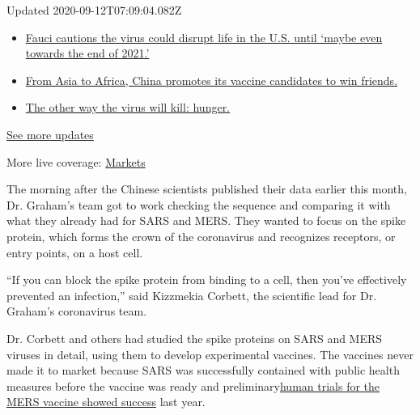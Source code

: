 Updated 2020-09-12T07:09:04.082Z

\begin{itemize}
\tightlist
\item
  \href{https://www.nytimes3xbfgragh.onion/2020/09/11/world/covid-19-coronavirus.html?action=click\&pgtype=Article\&state=default\&region=MAIN_CONTENT_1\&context=storylines_live_updates\#link-dfb8a16}{Fauci
  cautions the virus could disrupt life in the U.S. until `maybe even
  towards the end of 2021.'}
\item
  \href{https://www.nytimes3xbfgragh.onion/2020/09/11/world/covid-19-coronavirus.html?action=click\&pgtype=Article\&state=default\&region=MAIN_CONTENT_1\&context=storylines_live_updates\#link-7104d154}{From
  Asia to Africa, China promotes its vaccine candidates to win friends.}
\item
  \href{https://www.nytimes3xbfgragh.onion/2020/09/11/world/covid-19-coronavirus.html?action=click\&pgtype=Article\&state=default\&region=MAIN_CONTENT_1\&context=storylines_live_updates\#link-393ad215}{The
  other way the virus will kill: hunger.}
\end{itemize}

\href{https://www.nytimes3xbfgragh.onion/2020/09/11/world/covid-19-coronavirus.html?action=click\&pgtype=Article\&state=default\&region=MAIN_CONTENT_1\&context=storylines_live_updates}{See
more updates}

More live coverage:
\href{https://www.nytimes3xbfgragh.onion/live/2020/09/11/business/stock-market-today-coronavirus?action=click\&pgtype=Article\&state=default\&region=MAIN_CONTENT_1\&context=storylines_live_updates}{Markets}

The morning after the Chinese scientists published their data earlier
this month, Dr. Graham's team got to work checking the sequence and
comparing it with what they already had for SARS and MERS. They wanted
to focus on the spike protein, which forms the crown of the coronavirus
and recognizes receptors, or entry points, on a host cell.

``If you can block the spike protein from binding to a cell, then you've
effectively prevented an infection,'' said Kizzmekia Corbett, the
scientific lead for Dr. Graham's coronavirus team.

Dr. Corbett and others had studied the spike proteins on SARS and MERS
viruses in detail, using them to develop experimental vaccines. The
vaccines never made it to market because SARS was successfully contained
with public health measures before the vaccine was ready and
preliminary\href{https://www.thelancet.com/journals/laninf/article/PIIS1473-3099(19)30266-X/fulltext}{human
trials for the MERS vaccine showed success} last year.


